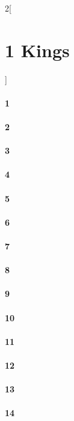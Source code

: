 \documentclass{book}
\begin{document}
\begin{multicols}{2}[\part{1 Kings}]
\subsection*{1}
\subsection*{2}
\subsection*{3}
\subsection*{4}
\subsection*{5}
\subsection*{6}
\subsection*{7}
\subsection*{8}
\subsection*{9}
\subsection*{10}
\subsection*{11}
\subsection*{12}
\subsection*{13}
\subsection*{14}

\end{multicols}
\end{document}

